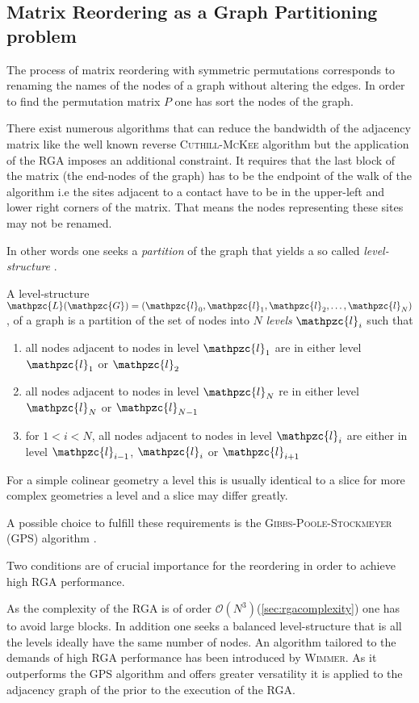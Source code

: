 \subsection{Matrix Reordering as a Graph Partitioning problem}
The process of matrix reordering with symmetric permutations corresponds to renaming the names of the nodes of a graph without altering the edges. In order to find the permutation matrix $P$ one has sort the nodes of the graph.\par
There exist numerous algorithms that can reduce the bandwidth of the adjacency matrix like the well known reverse \textsc{Cuthill-McKee} algorithm but the application of the RGA imposes an additional constraint. It requires that the last block of the matrix (the end-nodes of the graph) has to be the endpoint of the walk of the algorithm i.e the sites adjacent to a contact have to be in the upper-left and lower right corners of the matrix. That means the nodes representing these sites may not be renamed.\par
In other words one seeks a \emph{partition} of the graph that yields a so called \emph{level-structure} \cite{gibbs.Siam.13.236}.
\begin{dfn}
A level-structure $\mathpzc{L}(\mathpzc{G}) = (\mathpzc{l}_0,\mathpzc{l}_1,\mathpzc{l}_2,\dotsc,\mathpzc{l}_N)$, of a graph  is a partition of the set of nodes  into $N$ \emph{levels} $\mathpzc{l}_i$ such that
\begin{enumerate}
\item all nodes adjacent to nodes in level $\mathpzc{l}_1$ are in either level $\mathpzc{l}_1$ or $\mathpzc{l}_2$
\item all nodes adjacent to nodes in level $\mathpzc{l}_N$ re in either level $\mathpzc{l}_{N}$ or $\mathpzc{l}_{N-1}$
\item for $1 < i < N$, all nodes adjacent to nodes in level $\mathpzc{l}_{i}$ are either in level $\mathpzc{l}_{i-1}$, $\mathpzc{l}_{i}$ or $\mathpzc{l}_{i+1}$
\end{enumerate}
\end{dfn}
For a simple colinear geometry a level this is usually identical to a slice for more complex geometries a level and a slice may differ greatly.\par
A possible choice to fulfill these requirements is the \textsc{Gibbs-Poole-Stockmeyer} (GPS) algorithm \cite{gibbs.Siam.13.236}.\par
Two conditions are of crucial importance for the reordering in order to achieve high RGA performance.\par
As the complexity of the RGA is of order $\mathcal{O}(N^3)$(\ref{sec:rgacomplexity}) one has to avoid large blocks. In addition one seeks a balanced level-structure that is all the levels ideally have the same number of nodes.
An algorithm tailored to the demands of high RGA performance has been introduced by \textsc{Wimmer}. As it outperforms the GPS algorithm and offers greater versatility \cite{Wimmer2009JComPhys} it is applied to the adjacency graph of the \hamil{} prior to the execution of the RGA.
